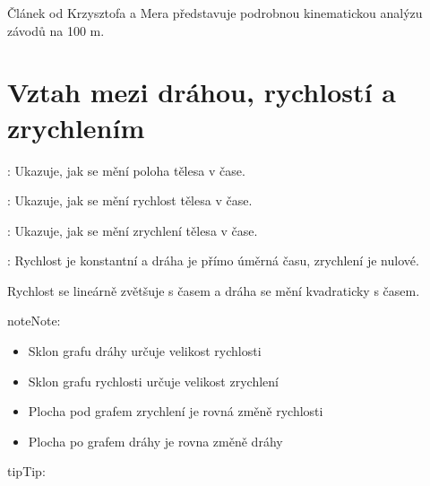 \documentclass[letterpaper,10pt,english]{jupyterBook}
\begin{document}
\sphinxAtStartPar
Článek  od Krzysztofa a Mera představuje podrobnou kinematickou analýzu závodů na 100 m.


\section{Vztah mezi dráhou, rychlostí a zrychlením}
\label{\detokenize{Prednasky/1_2_Kinematika_v_1D:vztah-mezi-drahou-rychlosti-a-zrychlenim}}
\sphinxAtStartPar
{}: Ukazuje, jak se mění poloha tělesa v čase.

\sphinxAtStartPar
{}: Ukazuje, jak se mění rychlost tělesa v čase.

\sphinxAtStartPar
{}: Ukazuje, jak se mění zrychlení tělesa v čase.

\sphinxAtStartPar
{}: Rychlost je konstantní a dráha je přímo úměrná času, zrychlení je nulové.

\sphinxAtStartPar
{} Rychlost se lineárně zvětšuje s časem a dráha se mění kvadraticky s časem.

\begin{sphinxadmonition}{note}{Note:}
\sphinxAtStartPar
{}
\begin{itemize}
\item {} 
\sphinxAtStartPar
Sklon grafu dráhy určuje velikost rychlosti

\item {} 
\sphinxAtStartPar
Sklon grafu rychlosti určuje velikost zrychlení

\item {} 
\sphinxAtStartPar
Plocha pod grafem zrychlení je rovná změně rychlosti

\item {} 
\sphinxAtStartPar
Plocha po grafem dráhy je rovna změně dráhy

\end{itemize}
\end{sphinxadmonition}

\sphinxAtStartPar
{}

\begin{sphinxadmonition}{tip}{Tip:}
\sphinxAtStartPar
{}
\end{sphinxadmonition}
\end{document}
